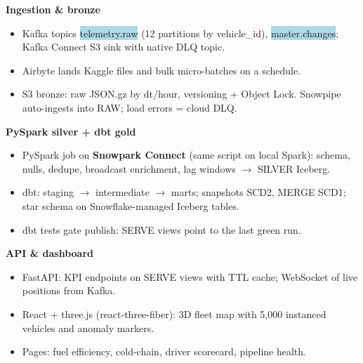 \documentclass[10pt,a4paper]{article}
\newcommand{\code}[1]{\colorbox{lightblue}{\ttfamily\scriptsize #1}}
\begin{document}
\begin{tcbraster}[raster columns=3, raster equal height, raster column skip=6pt, colback=white, colframe=cardline, boxrule=0.6pt, arc=3pt, left=4pt, right=4pt, top=3pt, bottom=3pt, fontupper=\footnotesize\raggedright]
\begin{tcolorbox}
{\small\bfseries\color{navy}Ingestion \& bronze\par}\vspace{2pt}
\begin{itemize}
\item Kafka topics \code{telemetry.raw} (12 partitions by vehicle\_id), \code{master.changes}; Kafka Connect S3 sink with native DLQ topic.
\item Airbyte lands Kaggle files and bulk micro-batches on a schedule.
\item S3 bronze: raw JSON.gz by dt/hour, versioning + Object Lock. Snowpipe auto-ingests into RAW; load errors = cloud DLQ.
\end{itemize}
\end{tcolorbox}
\begin{tcolorbox}
{\small\bfseries\color{navy}PySpark silver + dbt gold\par}\vspace{2pt}
\begin{itemize}
\item PySpark job on \textbf{Snowpark Connect} (same script on local Spark): schema, nulls, dedupe, broadcast enrichment, lag windows $\rightarrow$ SILVER Iceberg.
\item dbt: staging $\rightarrow$ intermediate $\rightarrow$ marts; snapshots SCD2, MERGE SCD1; star schema on Snowflake-managed Iceberg tables.
\item dbt tests gate publish: SERVE views point to the last green run.
\end{itemize}
\end{tcolorbox}
\begin{tcolorbox}
{\small\bfseries\color{navy}API \& dashboard\par}\vspace{2pt}
\begin{itemize}
\item FastAPI: KPI endpoints on SERVE views with TTL cache; WebSocket of live positions from Kafka.
\item React + three.js (react-three-fiber): 3D fleet map with 5,000 instanced vehicles and anomaly markers.
\item Pages: fuel efficiency, cold-chain, driver scorecard, pipeline health.
\end{itemize}
\end{tcolorbox}
\end{tcbraster}
\end{document}
